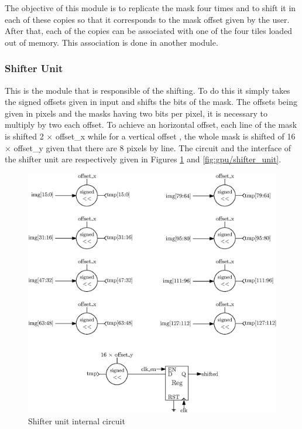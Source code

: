The objective of this module is to replicate the mask four times and to shift it in each of these 
copies so that it corresponds to the mask offset given by the user. After that, each of the copies 
can be associated with one of the four tiles loaded out of memory. This association is done in 
another module.

\subsubsection*{Shifter Unit}

This is the module that is responsible of the shifting. To do this it simply takes the signed 
offsets given in input and shifts the bits of the mask. The offsets being given in pixels and the
masks having two bits per pixel, it is necessary to multiply by two each offset. To achieve an 
horizontal offset, each line of the mask is shifted 2 $\times$ offset\_x while for a vertical offset 
, the whole mask is shifted of 16 $\times$ offset\_y given that there are 8 pixels 
by line. The circuit and the interface of the shifter unit are respectively given in Figures
\ref{fig:gpu/shifter_unit_in} and \ref{fig:gpu/shifter_unit}.

\begin{figure}[H]
    \centering
    \includegraphics[width=\linewidth]{Chapter4-GPU_CLKU/res/shifter_unit_in}
    \caption{Shifter unit internal circuit}
    \label{fig:gpu/shifter_unit_in}
\end{figure}

